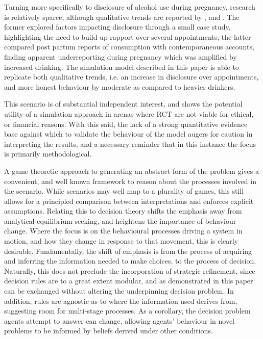 Turning more specifically to disclosure of alcohol use during pregnancy, research is relatively sparce, although qualitative trends are reported by \citet{Phillips2007}, and \citet{Alvik2006}. The former explored factors impacting disclosure through a small case study, highlighting the need to build up rapport over several appointments; the latter compared post partum reports of consumption with contemporaneous accounts, finding apparent underreporting during pregnancy which was amplified by increased drinking. The simulation model described in this paper is able to replicate both qualitative trends, i.e. an increase in disclosure over appointments, and more honest behaviour by moderate as compared to heavier drinkers.

This scenario is of substantial independent interest, and shows the potential utility of a simulation approach in arenas where \ac{RCT} are not viable for ethical, or financial reasons. With this said, the lack of a strong quantitative evidence base against which to validate the behaviour of the model augers for caution in interpreting the results, and a necessary reminder that in this instance the focus is primarily methodological.


A game theoretic approach to generating an abstract form of the problem gives a convenient, and well known framework to reason about the processes involved in the scenario. While scenarios may well map to a plurality of games, this still allows for a principled comparison between interpretations and enforces explicit assumptions. Relating this to decision theory shifts the emphasis away from analytical equilibrium-seeking, and heightens the importance of behaviour change. Where the focus is on the behavioural processes driving a system in motion, and how they change in response to that movement, this is clearly desirable.
Fundamentally, the shift of emphasis is from the process of acquiring and inferring the information needed to make choices, to the process of decision.
Naturally, this does not preclude the incorporation of strategic refinement, since decision rules are to a great extent modular, and as demonstrated in this paper can be exchanged without altering the underpinning decision problem. In addition, rules are agnostic as to where the information used derives from, suggesting room for multi-stage processes.  As a corollary, the decision problem agents attempt to answer can change, allowing agents' behaviour in novel problems to be informed by beliefs derived under other conditions. 

